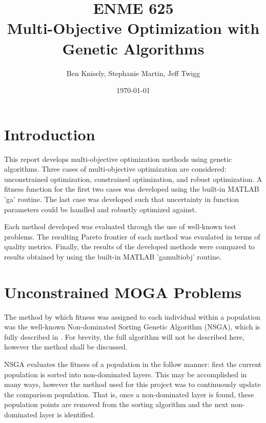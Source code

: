 \documentclass{article}
\title{ENME 625 \\
Multi-Objective Optimization with Genetic Algorithms}
\author{Ben Knisely, Stephanie Martin, Jeff Twigg}
\date{ \today }
\begin{document}
 
\maketitle

\newpage
 
\tableofcontents
 
\newpage 
 
\section{Introduction}
 
This report develops multi-objective optimization methods using genetic algorithms. Three cases of multi-objective optimization are considered: unconstrained optimization, constrained optimization, and robust optimization. A fitness function for the first two cases was developed using the built-in MATLAB 'ga' routine. The last case was developed such that uncertainty in function parameters could be handled and robustly optimized against. \newline

\noindent Each method developed was evaluated through the use of well-known test problems. The resulting Pareto frontier of each method was evaulated in terms of quality metrics. Finally, the results of the developed methods were compared to results obtained by using the built-in MATLAB 'gamultiobj' routine.
 

\section{Unconstrained MOGA Problems}
The method by which fitness was assigned to each individual within a population was the well-known Non-dominated Sorting Genetic Algorithm (NSGA), which is fully described in \cite{deb2001multi}. For brevity, the full algorithm will not be described here, however the method shall be discussed. \newline

\noindent NSGA evaluates the fitness of a population in the follow manner: first the current population is sorted into non-dominated layers. This may be accomplished in many ways, however the method used for this project was to continuously update the comparison population. That is, once a non-dominated layer is found, these population points are removed from the sorting algorithm and the next non-dominated layer is identified.  \newline
\end{document}
